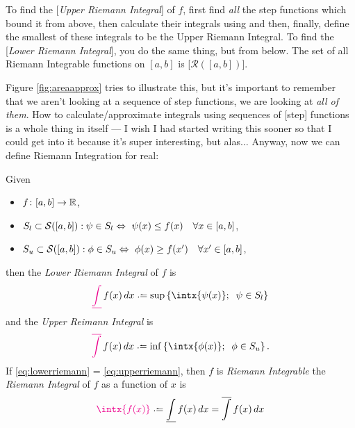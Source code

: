 \medskip
To find the [\emph{Upper Riemann Integral}] of $f$, first find \emph{all} the step functions which bound it from above, then calculate their integrals using  and then, finally, define the smallest of these integrals to be the Upper Riemann Integral. To find the [\emph{Lower Riemann Integral}], you do the same thing, but from below. The set of all Riemann Integrable functions on $[a,b]$ is [\emph{$\mathcal{R}([a, b])$}].

\medskip
Figure \ref{fig:areaapprox} tries to illustrate this, but it's important to remember that we aren't looking at a sequence of step functions, we are looking at \emph{all of them}. How to calculate/approximate integrals using sequences of [step] functions is a whole thing in itself --- I wish I had started writing this sooner so that I could get into it because it's super interesting, but alas$\ldots$ Anyway, now we can define Riemann Integration for real:

\begin{definition}\label{def:riemann}
	Given  
	\begin{itemize}
	\item
		$f\colon [a, b] \rightarrow \mathbb{R}$,
	\item
		$S_l \subset \mathcal{S}([a, b]) : \psi \in S_l \Leftrightarrow \ \psi(x) \leq f(x) \quad \forall x \in [a, b] $,
	\item
		$S_u \subset \mathcal{S}([a, b]) : \phi \in S_u \Leftrightarrow \ \phi(x) \geq f(x') \quad \forall x' \in [a, b] $,
	\end{itemize}
	then the {\color{Magenta}\emph{Lower Riemann Integral}} of $f$ is
	\begin{equation}
		{\color{Magenta}\underline {\int}} \, f(x) \, dx \defeq \sup \left\{\intx{\psi(x)}; \;\; \psi \in S_l\right\}
		\label{eq:lowerriemann}
	\end{equation} 
	and the {\color{Magenta}\emph{Upper Reimann Integral}} is
	\begin{equation}
		{\color{Magenta}\overline {\int}} \, f(x) \, dx \defeq \inf \left\{\intx{\phi(x)}; \;\; \phi \in S_u\right\}.
		\label{eq:upperriemann}
	\end{equation}
	If \eqref{eq:lowerriemann} = \eqref{eq:upperriemann}, then $f$ is {\color{Magenta}\emph{Riemann Integrable}} the {\color{Magenta}\emph{Riemann Integral}} of $f$ as a function of $x$ is 
	\begin{equation}
		{\color{Magenta}\intx{f(x)}} \defeq \underline {\int} \, f(x) \, dx = \overline {\int} \, f(x) \, dx
		\label{eq:riemann}
	\end{equation}
\end{definition}
